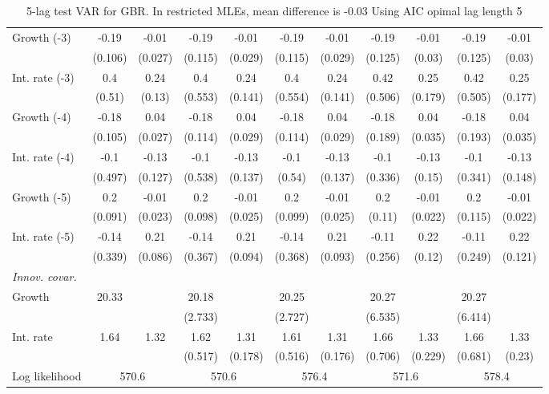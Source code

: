 \begin{table}[htbp]
\begin{tabular}{@{\extracolsep{4pt}}lcccccccccc@{}}
\quad Growth (-3) 	 &-0.19 	 & -0.01 	 & -0.19 	 & -0.01 	 & -0.19 	 & -0.01 	 & -0.19 	 & -0.01 	 & -0.19 	 & -0.01	 \\ 
 		 & (0.106) 	 & (0.027) 	 & (0.115) 	 & (0.029) 	 & (0.115) 	 & (0.029) 	 & (0.125) 	 & (0.03) 	 & (0.125) 	 & (0.03) 	 \\ 
\quad Int. rate (-3) 	 &0.4 	 & 0.24 	 & 0.4 	 & 0.24 	 & 0.4 	 & 0.24 	 & 0.42 	 & 0.25 	 & 0.42 	 & 0.25	 \\ 
 		 & (0.51) 	 & (0.13) 	 & (0.553) 	 & (0.141) 	 & (0.554) 	 & (0.141) 	 & (0.506) 	 & (0.179) 	 & (0.505) 	 & (0.177) 	 \\ 
\quad Growth (-4) 	 &-0.18 	 & 0.04 	 & -0.18 	 & 0.04 	 & -0.18 	 & 0.04 	 & -0.18 	 & 0.04 	 & -0.18 	 & 0.04	 \\ 
 		 & (0.105) 	 & (0.027) 	 & (0.114) 	 & (0.029) 	 & (0.114) 	 & (0.029) 	 & (0.189) 	 & (0.035) 	 & (0.193) 	 & (0.035) 	 \\ 
\quad Int. rate (-4) 	 &-0.1 	 & -0.13 	 & -0.1 	 & -0.13 	 & -0.1 	 & -0.13 	 & -0.1 	 & -0.13 	 & -0.1 	 & -0.13	 \\ 
 		 & (0.497) 	 & (0.127) 	 & (0.538) 	 & (0.137) 	 & (0.54) 	 & (0.137) 	 & (0.336) 	 & (0.15) 	 & (0.341) 	 & (0.148) 	 \\ 
\quad Growth (-5) 	 &0.2 	 & -0.01 	 & 0.2 	 & -0.01 	 & 0.2 	 & -0.01 	 & 0.2 	 & -0.01 	 & 0.2 	 & -0.01	 \\ 
 		 & (0.091) 	 & (0.023) 	 & (0.098) 	 & (0.025) 	 & (0.099) 	 & (0.025) 	 & (0.11) 	 & (0.022) 	 & (0.115) 	 & (0.022) 	 \\ 
\quad Int. rate (-5) 	 &-0.14 	 & 0.21 	 & -0.14 	 & 0.21 	 & -0.14 	 & 0.21 	 & -0.11 	 & 0.22 	 & -0.11 	 & 0.22	 \\ 
 		 & (0.339) 	 & (0.086) 	 & (0.367) 	 & (0.094) 	 & (0.368) 	 & (0.093) 	 & (0.256) 	 & (0.12) 	 & (0.249) 	 & (0.121) 	 \\ 
\rule{0pt}{4ex} \emph{Innov. covar.}  	 & 	 & 	 & 	 & 	 & 	 & 	 & 	 & 	 & 	 &\\ 
\quad Growth 	 &20.33 	 &  	 & 20.18 	 &  	 & 20.25 	 &  	 & 20.27 	 &  	 & 20.27 	 & 	 \\ 
 		 &  	 &  	 & (2.733) 	 &  	 & (2.727) 	 &  	 & (6.535) 	 &  	 & (6.414) 	 &  	 \\ 
\quad Int. rate 	 &1.64 	 & 1.32 	 & 1.62 	 & 1.31 	 & 1.61 	 & 1.31 	 & 1.66 	 & 1.33 	 & 1.66 	 & 1.33	 \\ 
 		 &  	 &  	 & (0.517) 	 & (0.178) 	 & (0.516) 	 & (0.176) 	 & (0.706) 	 & (0.229) 	 & (0.681) 	 & (0.23) 	 \\ 
 \hline \rule{0pt}{4ex} 
  Log likelihood 	 &\multicolumn{2}{c}{570.6} 	 & \multicolumn{2}{c}{570.6} 	 & \multicolumn{2}{c}{576.4} 	 & \multicolumn{2}{c}{571.6} 	 & \multicolumn{2}{c}{578.4}\\ 

 \hline 	\end{tabular}		\caption{5-lag test VAR for GBR. In restricted MLEs, mean difference is -0.03 Using AIC opimal lag length 5}
		\label{tab:GBRopt_}

\end{table}